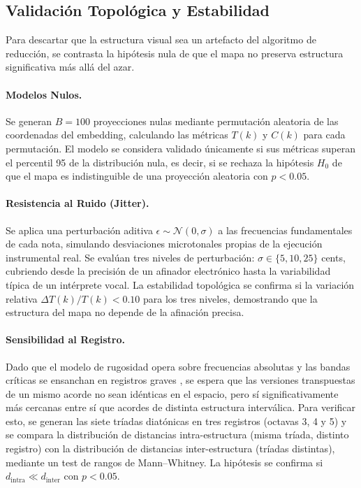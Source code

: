 \subsection{Validación Topológica y Estabilidad}
Para descartar que la estructura visual sea un artefacto del algoritmo de reducción, se contrasta la hipótesis nula de que el mapa no preserva estructura significativa más allá del azar.

\paragraph{Modelos Nulos.}
Se generan $B = 100$ proyecciones nulas mediante permutación aleatoria de las coordenadas del embedding, calculando las métricas $T(k)$ y $C(k)$ para cada permutación. El modelo se considera validado únicamente si sus métricas superan el percentil 95 de la distribución nula, es decir, si se rechaza la hipótesis $H_0$ de que el mapa es indistinguible de una proyección aleatoria con $p < 0.05$.

\paragraph{Resistencia al Ruido (Jitter).}
Se aplica una perturbación aditiva $\epsilon \sim \mathcal{N}(0, \sigma)$ a las frecuencias fundamentales de cada nota, simulando desviaciones microtonales propias de la ejecución instrumental real. Se evalúan tres niveles de perturbación: $\sigma \in \{5, 10, 25\}$ cents, cubriendo desde la precisión de un afinador electrónico hasta la variabilidad típica de un intérprete vocal. La estabilidad topológica se confirma si la variación relativa $\Delta T(k) / T(k) < 0.10$ para los tres niveles, demostrando que la estructura del mapa no depende de la afinación precisa.

\paragraph{Sensibilidad al Registro.}
Dado que el modelo de rugosidad opera sobre frecuencias absolutas y las bandas críticas se ensanchan en registros graves \cite{Eerola2022}, se espera que las versiones transpuestas de un mismo acorde no sean idénticas en el espacio, pero sí significativamente más cercanas entre sí que acordes de distinta estructura interválica. Para verificar esto, se generan las siete tríadas diatónicas en tres registros (octavas 3, 4 y 5) y se compara la distribución de distancias intra-estructura (misma tríada, distinto registro) con la distribución de distancias inter-estructura (tríadas distintas), mediante un test de rangos de Mann--Whitney. La hipótesis se confirma si $d_{\text{intra}} \ll d_{\text{inter}}$ con $p < 0.05$.

